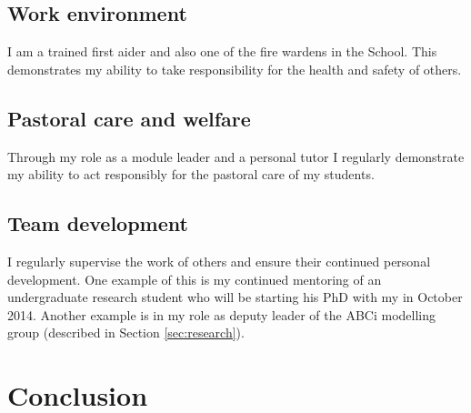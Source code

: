 \documentclass{article}
\begin{document}
\subsection{Work environment}

I am a trained first aider and also one of the fire wardens in the School.
This demonstrates my ability to take responsibility for the health and safety of others.

\subsection{Pastoral care and welfare}

Through my role as a module leader and a personal tutor I regularly demonstrate my ability to act responsibly for the pastoral care of my students.

\subsection{Team development}

I regularly supervise the work of others and ensure their continued personal development.
One example of this is my continued mentoring of an undergraduate research student who will be starting his PhD with my in October 2014.
Another example is in my role as deputy leader of the ABCi modelling group (described in Section \ref{sec:research}).

\section{Conclusion}\label{sec:conclusion}

\newpage


\end{document}

